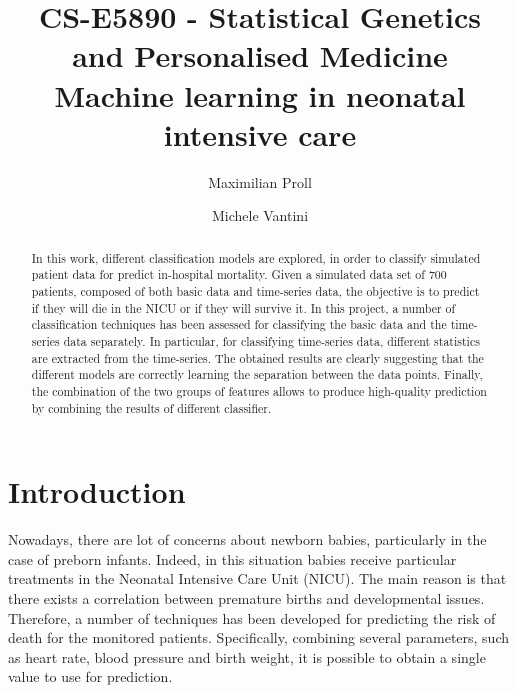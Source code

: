 \documentclass[a4paper,11pt]{article}
\begin{document}
\renewcommand{\refname}{} %


\title{CS-E5890 - Statistical Genetics and Personalised Medicine \\ Machine learning in neonatal intensive care}

\author{Maximilian Proll \and Michele Vantini}

\maketitle


\begin{abstract}
In this work, different classification models are explored, in order to classify simulated patient data for predict in-hospital mortality. Given a simulated data set of 700 patients, composed of both basic data and time-series data, the objective is to predict if they will die in the NICU or if they will survive it.
In this project, a number of classification techniques has been assessed for classifying the basic data and the time-series data separately. In particular, for classifying time-series data, different statistics are extracted from the time-series. The obtained results are clearly suggesting that the different models are correctly learning the separation between the data points. Finally, the combination of the two groups of features allows to produce high-quality prediction by combining the results of different classifier.
\end{abstract}

\section{Introduction}
Nowadays, there are lot of concerns about newborn babies, particularly in the case of preborn infants. Indeed, in this situation babies receive particular treatments in the Neonatal Intensive Care Unit (NICU). The main reason is that there exists a correlation between premature births and developmental issues. Therefore, a number of techniques has been developed for predicting the risk of death for the monitored patients. Specifically, combining several parameters, such as heart rate, blood pressure and birth weight, it is possible to obtain a single value to use for prediction.
\end{document}
